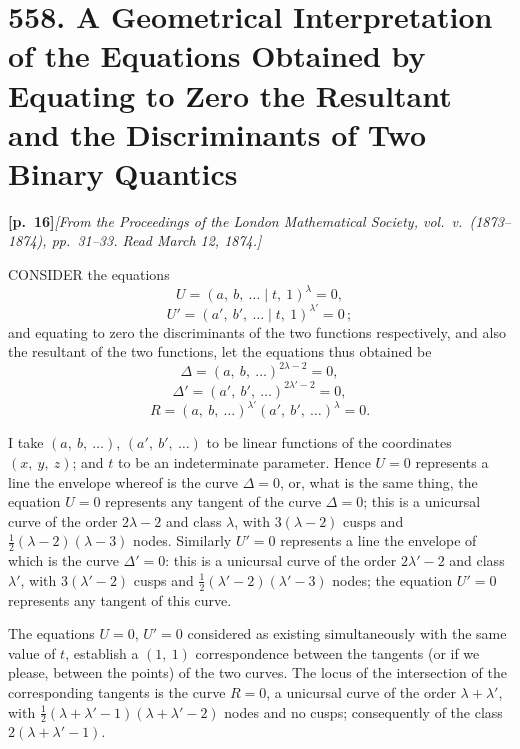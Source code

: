 \documentclass[11pt,a4paper]{article}
\begin{document}
\bigskip

\section*{\textbf{558.} A Geometrical Interpretation of the Equations Obtained by Equating to Zero the Resultant and the Discriminants of Two Binary Quantics}

\noindent\textbf{[p.~16]}\quad\textit{[From the Proceedings of the London Mathematical Society, vol.~v.\ (1873--1874), pp.~31--33. Read March 12, 1874.]}

\bigskip

CONSIDER the equations
\[
U = (a,\ b,\ \ldots \mid t,\ 1)^{\lambda} = 0,
\]
\[
U' = (a',\ b',\ \ldots \mid t,\ 1)^{\lambda'} = 0\,;
\]
and equating to zero the discriminants of the two functions respectively, and also the resultant of the two functions, let the equations thus obtained be
\[
\Delta = (a,\ b,\ \ldots)^{2\lambda - 2} = 0,
\]
\[
\Delta' = (a',\ b',\ \ldots)^{2\lambda' - 2} = 0,
\]
\[
R = (a,\ b,\ \ldots)^{\lambda'} (a',\ b',\ \ldots)^{\lambda} = 0.
\]

I take $(a,\ b,\ \ldots)$, $(a',\ b',\ \ldots)$ to be linear functions of the coordinates $(x,\ y,\ z)$; and $t$ to be an indeterminate parameter. Hence $U = 0$ represents a line the envelope whereof is the curve $\Delta = 0$, or, what is the same thing, the equation $U = 0$ represents any tangent of the curve $\Delta = 0$; this is a unicursal curve of the order $2\lambda - 2$ and class $\lambda$, with $3(\lambda - 2)$ cusps and $\tfrac{1}{2}(\lambda - 2)(\lambda - 3)$ nodes. Similarly $U' = 0$ represents a line the envelope of which is the curve $\Delta' = 0$: this is a unicursal curve of the order $2\lambda' - 2$ and class $\lambda'$, with $3(\lambda' - 2)$ cusps and $\tfrac{1}{2}(\lambda' - 2)(\lambda' - 3)$ nodes; the equation $U' = 0$ represents any tangent of this curve.

\medskip

The equations $U = 0$, $U' = 0$ considered as existing simultaneously with the same value of $t$, establish a $(1,\ 1)$ correspondence between the tangents (or if we please, between the points) of the two curves. The locus of the intersection of the corresponding tangents is the curve $R = 0$, a unicursal curve of the order $\lambda + \lambda'$, with $\tfrac{1}{2}(\lambda + \lambda' - 1)(\lambda + \lambda' - 2)$ nodes and no cusps; consequently of the class $2(\lambda + \lambda' - 1)$.
\end{document}
